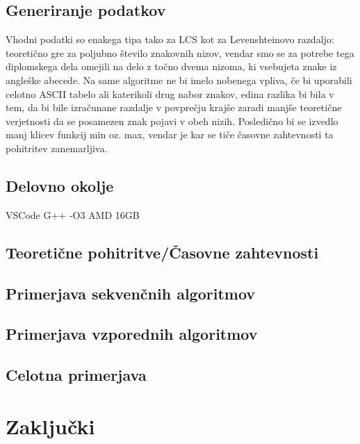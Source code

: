 \documentclass[a4paper,12pt,openright]{book}
\begin{document}
\section{Generiranje podatkov}

Vhodni podatki so enakega tipa tako za LCS kot za Levenshteinovo razdaljo: teoretično gre za poljubno število znakovnih nizov, vendar smo se za potrebe tega diplomskega dela omejili na delo z točno dvema nizoma, ki vsebujeta znake iz angleške abecede. Na same algoritme ne bi imelo nobenega vpliva, če bi uporabili celotno ASCII tabelo ali katerikoli drug nabor znakov, edina razlika bi bila v tem, da bi bile izračunane razdalje v povprečju krajše zaradi manjše teoretične verjetnosti da se posamezen znak pojavi v obeh nizih. Posledično bi se izvedlo manj klicev funkcij min oz. max, vendar je kar se tiče časovne zahtevnosti ta pohitritev zanemarljiva. 

\section{Delovno okolje}

VSCode
G++
-O3
AMD
16GB

\section{Teoretične pohitritve/Časovne zahtevnosti}



\section{Primerjava sekvenčnih algoritmov}



\section{Primerjava vzporednih algoritmov}



\section{Celotna primerjava}






\chapter{Zaključki}
\end{document}
